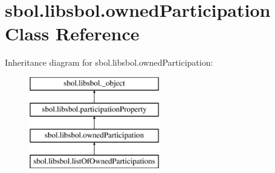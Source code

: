 \hypertarget{classsbol_1_1libsbol_1_1owned_participation}{}\section{sbol.\+libsbol.\+owned\+Participation Class Reference}
\label{classsbol_1_1libsbol_1_1owned_participation}
Inheritance diagram for sbol.\+libsbol.\+owned\+Participation\+:\begin{figure}[H]
\begin{center}
\leavevmode
\includegraphics[height=4.000000cm]{classsbol_1_1libsbol_1_1owned_participation}
\end{center}
\end{figure}
